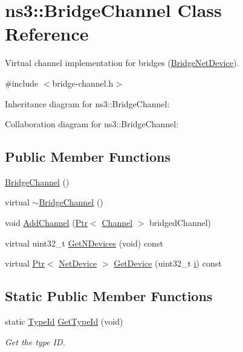 \hypertarget{classns3_1_1BridgeChannel}{}\section{ns3\+:\+:Bridge\+Channel Class Reference}
\label{classns3_1_1BridgeChannel}


Virtual channel implementation for bridges (\hyperlink{classns3_1_1BridgeNetDevice}{Bridge\+Net\+Device}).  




{\ttfamily \#include $<$bridge-\/channel.\+h$>$}



Inheritance diagram for ns3\+:\+:Bridge\+Channel\+:


Collaboration diagram for ns3\+:\+:Bridge\+Channel\+:
\subsection*{Public Member Functions}
\begin{DoxyCompactItemize}
\item 
\hyperlink{classns3_1_1BridgeChannel_a18146e0d84129a743f3224cf99a1183d}{Bridge\+Channel} ()
\item 
virtual \hyperlink{classns3_1_1BridgeChannel_a10cd65b14332a912036187bfeb4a8a07}{$\sim$\+Bridge\+Channel} ()
\item 
void \hyperlink{classns3_1_1BridgeChannel_a55a31a5f88740271f790bbc25c2e2d4d}{Add\+Channel} (\hyperlink{classns3_1_1Ptr}{Ptr}$<$ \hyperlink{classns3_1_1Channel}{Channel} $>$ bridged\+Channel)
\item 
virtual uint32\+\_\+t \hyperlink{classns3_1_1BridgeChannel_a71e89d3c21406c1896ac78aef7a48c9b}{Get\+N\+Devices} (void) const 
\item 
virtual \hyperlink{classns3_1_1Ptr}{Ptr}$<$ \hyperlink{classns3_1_1NetDevice}{Net\+Device} $>$ \hyperlink{classns3_1_1BridgeChannel_a0cd52c2034998de11dc13e821d547202}{Get\+Device} (uint32\+\_\+t \hyperlink{lte__uplink__power__control_8m_a6f6ccfcf58b31cb6412107d9d5281426}{i}) const 
\end{DoxyCompactItemize}
\subsection*{Static Public Member Functions}
\begin{DoxyCompactItemize}
\item 
static \hyperlink{classns3_1_1TypeId}{Type\+Id} \hyperlink{classns3_1_1BridgeChannel_a712e64db6fe85a59c1b38cfa914c9a77}{Get\+Type\+Id} (void)
\begin{DoxyCompactList}\small\item\em Get the type ID. \end{DoxyCompactList}\end{DoxyCompactItemize}
